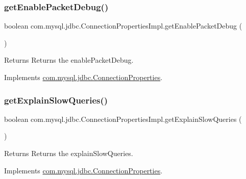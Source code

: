 \subsubsection{\texorpdfstring{get\+Enable\+Packet\+Debug()}{getEnablePacketDebug()}}
{\footnotesize\ttfamily boolean com.\+mysql.\+jdbc.\+Connection\+Properties\+Impl.\+get\+Enable\+Packet\+Debug (\begin{DoxyParamCaption}{ }\end{DoxyParamCaption})}

\begin{DoxyReturn}{Returns}
Returns the enable\+Packet\+Debug. 
\end{DoxyReturn}


Implements \mbox{\hyperlink{interfacecom_1_1mysql_1_1jdbc_1_1_connection_properties_accdc773d99a84b7b1db522aa324d6084}{com.\+mysql.\+jdbc.\+Connection\+Properties}}.

\mbox{\label{classcom_1_1mysql_1_1jdbc_1_1_connection_properties_impl_aa03592149273154c28f81b184c3af796}} 
\subsubsection{\texorpdfstring{get\+Explain\+Slow\+Queries()}{getExplainSlowQueries()}}
{\footnotesize\ttfamily boolean com.\+mysql.\+jdbc.\+Connection\+Properties\+Impl.\+get\+Explain\+Slow\+Queries (\begin{DoxyParamCaption}{ }\end{DoxyParamCaption})}

\begin{DoxyReturn}{Returns}
Returns the explain\+Slow\+Queries. 
\end{DoxyReturn}


Implements \mbox{\hyperlink{interfacecom_1_1mysql_1_1jdbc_1_1_connection_properties_a51ec93b6fe482627e109814e0985c940}{com.\+mysql.\+jdbc.\+Connection\+Properties}}.

\mbox{\label{classcom_1_1mysql_1_1jdbc_1_1_connection_properties_impl_acc467008bf52946ef7c6b3d3d9b6f390}} 
